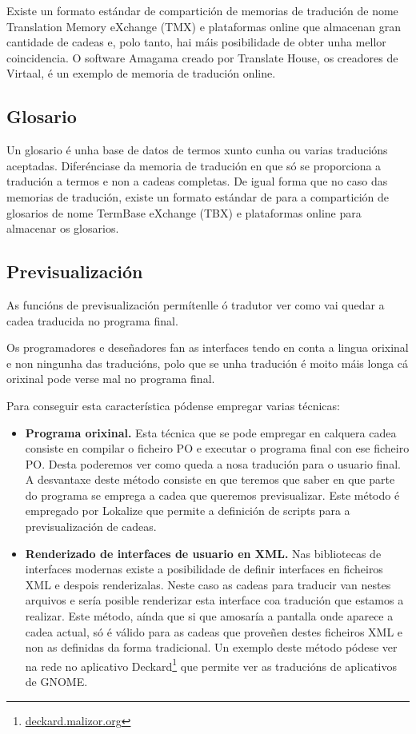 Existe un formato estándar de compartición de memorias de tradución de nome Translation Memory eXchange (TMX) e plataformas online que almacenan gran cantidade de cadeas e, polo tanto, hai máis posibilidade de obter unha mellor coincidencia. O software Amagama creado por Translate House, os creadores de Virtaal, é un exemplo de memoria de tradución online.

\subsection{Glosario}
Un glosario é unha base de datos de termos xunto cunha ou varias traducións aceptadas. Diferénciase da memoria de tradución en que só se proporciona a tradución a termos e non a cadeas completas. De igual forma que no caso das memorias de tradución, existe un formato estándar de para a compartición de glosarios de nome TermBase eXchange (TBX) e plataformas online para almacenar os glosarios.


\subsection{Previsualización}
As funcións de previsualización permítenlle ó tradutor ver como vai quedar a cadea traducida no programa final.

Os programadores e deseñadores fan as interfaces tendo en conta a lingua orixinal e non ningunha das traducións, polo que se unha tradución é moito máis longa cá orixinal pode verse mal no programa final.

Para conseguir esta característica pódense empregar varias técnicas:

\begin{itemize}
  \item \textbf{Programa orixinal.} Esta técnica que se pode empregar en calquera cadea consiste en compilar o ficheiro PO e executar o programa final con ese ficheiro PO. Desta poderemos ver como queda a nosa tradución para o usuario final. A desvantaxe deste método consiste en que teremos que saber en que parte do programa se emprega a cadea que queremos previsualizar. Este método é empregado por Lokalize que permite a definición de scripts para a previsualización de cadeas.

  \item \textbf{Renderizado de interfaces de usuario en XML.} Nas bibliotecas de interfaces modernas existe a posibilidade de definir interfaces en ficheiros XML e despois renderizalas. Neste caso as cadeas para traducir van nestes arquivos e sería posible renderizar esta interface coa tradución que estamos a realizar. Este método, aínda que si que amosaría a pantalla onde aparece a cadea actual, só é válido para as cadeas que proveñen destes ficheiros XML e non as definidas da forma tradicional. Un exemplo deste método pódese ver na rede no aplicativo Deckard\footnote{\href{http://deckard.malizor.org/}{deckard.malizor.org}} que permite ver as traducións de aplicativos de GNOME.
\end{itemize}


